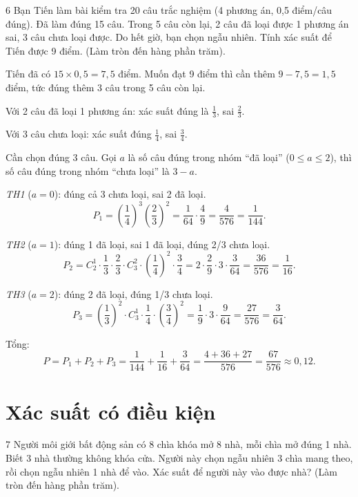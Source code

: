 \separator

\begin{baitoan}{6 \hfill {}}
Bạn Tiến làm bài kiểm tra 20 câu trắc nghiệm (4 phương án, 0,5 điểm/câu đúng). Đã làm đúng 15 câu. Trong 5 câu còn lại, 2 câu đã loại được 1 phương án sai, 3 câu chưa loại được. Do hết giờ, bạn chọn ngẫu nhiên. Tính xác suất để Tiến được 9 điểm. (Làm tròn đến hàng phần trăm).
\end{baitoan}

\begin{loigiai}
Tiến đã có $15 \times 0{,}5 = 7{,}5$ điểm. Muốn đạt 9 điểm thì cần thêm $9 - 7{,}5 = 1{,}5$ điểm, tức đúng thêm 3 câu trong 5 câu còn lại.

Với 2 câu đã loại 1 phương án: xác suất đúng là $\frac{1}{3}$, sai $\frac{2}{3}$.

Với 3 câu chưa loại: xác suất đúng $\frac{1}{4}$, sai $\frac{3}{4}$.

Cần chọn đúng 3 câu. Gọi $a$ là số câu đúng trong nhóm ``đã loại'' ($0 \le a \le 2$), thì số câu đúng trong nhóm ``chưa loại'' là $3 - a$.

\textit{TH1} ($a = 0$): đúng cả 3 chưa loại, sai 2 đã loại.
\[ P_1 = \left(\frac{1}{4}\right)^3 \left(\frac{2}{3}\right)^2 = \frac{1}{64} \cdot \frac{4}{9} = \frac{4}{576} = \frac{1}{144}. \]

\textit{TH2} ($a = 1$): đúng 1 đã loại, sai 1 đã loại, đúng 2/3 chưa loại. 
\[ P_2 = C_2^1 \cdot \frac{1}{3} \cdot \frac{2}{3} \cdot C_3^2 \cdot \left(\frac{1}{4}\right)^2 \cdot \frac{3}{4} = 2 \cdot \frac{2}{9} \cdot 3 \cdot \frac{3}{64} = \frac{36}{576} = \frac{1}{16}. \]

\textit{TH3} ($a = 2$): đúng 2 đã loại, đúng 1/3 chưa loại.
\[ P_3 = \left(\frac{1}{3}\right)^2 \cdot C_3^1 \cdot \frac{1}{4} \cdot \left(\frac{3}{4}\right)^2 = \frac{1}{9} \cdot 3 \cdot \frac{9}{64} = \frac{27}{576} = \frac{3}{64}. \]

Tổng:
\[ P = P_1 + P_2 + P_3 = \frac{1}{144} + \frac{1}{16} + \frac{3}{64} = \frac{4 + 36 + 27}{576} = \frac{67}{576} \approx \boxed{0{,}12}. \]
\end{loigiai}

\separator

\section{Xác suất có điều kiện}

\begin{baitoan}{7 \hfill {}}
Người môi giới bất động sản có 8 chìa khóa mở 8 nhà, mỗi chìa mở đúng 1 nhà. Biết 3 nhà thường không khóa cửa. Người này chọn ngẫu nhiên 3 chìa mang theo, rồi chọn ngẫu nhiên 1 nhà để vào. Xác suất để người này vào được nhà? (Làm tròn đến hàng phần trăm).
\end{baitoan}

